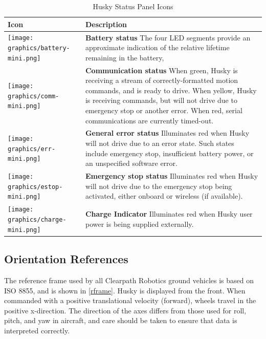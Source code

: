 \documentclass[]{clearpath-latex/clearpath-manual}
\begin{document}
\begin{table}[h]
  \renewcommand{\arraystretch}{1.6}
  \centering
    \begin{tabular}{ >{\centering\arraybackslash}m{.1\linewidth} >{\raggedright\arraybackslash}m{.7\linewidth} }
      \hline
    \rowcolor{lightgrey} Icon & Description
      \\ \hline
    \texttt{[image: graphics/battery-mini.png]} &
      \textbf{Battery status} The four LED segments provide an approximate indication of the relative lifetime remaining in the battery,
      \\[4pt] \hline
    \texttt{[image: graphics/comm-mini.png]} &
      \textbf{Communication status} When green, Husky is receiving a stream of correctly-formatted motion commands, and is ready to drive. When yellow, Husky is receiving commands, but will not drive due to emergency stop or another error. When red, serial communications are currently timed-out.
      \\[4pt] \hline
    \texttt{[image: graphics/err-mini.png]} &
      \textbf{General error status} Illuminates red when Husky will not drive due to an error state. Such states include emergency stop, insufficient battery power, or an unspecified software error.
      \\[4pt] \hline
    \texttt{[image: graphics/estop-mini.png]} &
      \textbf{Emergency stop status} Illuminates red when Husky will not drive due to the emergency stop being activated, either onboard or wireless (if available).
      \\[4pt] \hline
    \texttt{[image: graphics/charge-mini.png]} &
      \textbf{Charge Indicator} Illuminates red when Husky user power is being supplied externally.
      \\[4pt] \hline
    \end{tabular}
  \caption{Husky Status Panel Icons}
  \label{status_panel}
\end{table}
\newpage

\subsection{Orientation References}

The reference frame used by all Clearpath Robotics ground vehicles is based on ISO 8855, and is shown in \autoref{rframe}. Husky is displayed from the front. When commanded with a positive translational velocity (forward), wheels travel in the positive x-direction.
The direction of the axes differs from those used for roll, pitch, and yaw in aircraft, and care should be taken to ensure that data is interpreted correctly.
\end{document}
